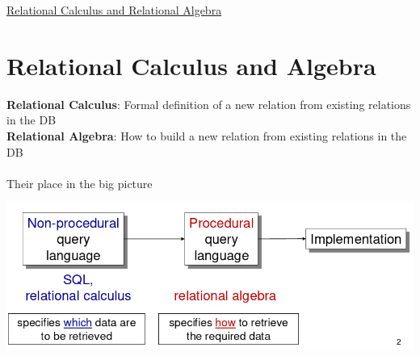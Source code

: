 \documentclass{article}[18pt]
\begin{document}
\begin{center}
\underline{\huge Relational Calculus and Relational Algebra}
\end{center}
\section{Relational Calculus and Algebra}
\textbf{Relational Calculus}: Formal definition of a new relation from existing relations in the DB\\
\textbf{Relational Algebra}: How to build a new relation from existing relations in the DB\\
\\
Their place in the big picture
\begin{center}
	\includegraphics[scale=0.7]{"big picture"}
\end{center}
\end{document}
